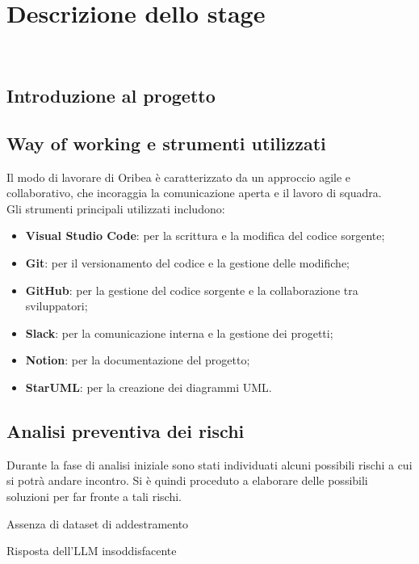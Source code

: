 \chapter{Descrizione dello stage}
\label{cap:descrizione-stage}

\\

\section{Introduzione al progetto}


\section{Way of working e strumenti utilizzati}
\label{sec:way-of-working}

Il modo di lavorare di Oribea è caratterizzato da un approccio agile e collaborativo, che incoraggia la comunicazione aperta e il lavoro di squadra.\\

Gli strumenti principali utilizzati includono:
\begin{itemize}
    \item \textbf{Visual Studio Code}: per la scrittura e la modifica del codice sorgente;
    \item \textbf{Git}: per il versionamento del codice e la gestione delle modifiche;
    \item \textbf{GitHub}: per la gestione del codice sorgente e la collaborazione tra sviluppatori;
    \item \textbf{Slack}: per la comunicazione interna e la gestione dei progetti;
    \item \textbf{Notion}: per la documentazione del progetto;
    \item \textbf{StarUML}: per la creazione dei diagrammi UML.
\end{itemize}

\section{Analisi preventiva dei rischi}

Durante la fase di analisi iniziale sono stati individuati alcuni possibili rischi a cui si potrà andare incontro.
Si è quindi proceduto a elaborare delle possibili soluzioni per far fronte a tali rischi.\\

\begin{risk}{Assenza di dataset di addestramento}
    \label{risk:dataset-absence} 
\end{risk}

\begin{risk}{Risposta dell'LLM insoddisfacente}
    \label{risk:bad-llm-response} 
\end{risk}

